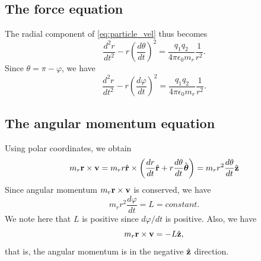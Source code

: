 \documentclass[oneside,a4paper,11pt]{report}
\begin{document}
\subsection{The force equation}
The radial component of \cref{eq:particle_vel} thus becomes 
\begin{equation}
    \frac{d^2 r}{dt^2} - r \left ( \frac{d\theta}{dt} \right )^2 = \frac{q_1 q_2}{4 \pi \epsilon_0 m_r} \frac{1}{r^2}.
\end{equation}
Since $\theta = \pi - \varphi$, we have
\begin{equation}
    \label{eq:particle_position_ode}
    \frac{d^2 r}{dt^2} - r \left ( \frac{d\varphi}{dt} \right )^2 = \frac{q_1 q_2}{4 \pi \epsilon_0 m_r} \frac{1}{r^2}.
\end{equation}

\subsection{The angular momentum equation}
Using polar coordinates, we obtain
\begin{equation}
    m_r \mathbf{r} \times \mathbf{v} = m_r r \hat{\mathbf{r}} \times \left ( \frac{dr}{dt} \hat{\mathbf{r}} + r \frac{d\theta}{dt} \hat{\boldsymbol{\theta}} \right ) = m_r r^2 \frac{d\theta}{dt} \hat{\mathbf{z}}
\end{equation}
Since angular momentum $m_r \mathbf{r} \times \mathbf{v}$ is conserved, we have
\begin{equation}
    \label{eq:particle_cons_angular_polar}
    m_r r^2 \frac{d\varphi}{dt} = L = constant.
\end{equation}
We note here that $L$ is positive since $d\varphi/dt$ is positive. Also, we have 
\begin{equation}
    \label{eq:particle_angular_sign}
    m_r \mathbf{r} \times \mathbf{v} = -L \hat{\mathbf{z}},
\end{equation}
that is, the angular momentum is in the negative $\hat{\mathbf{z}}$ direction.

\end{document}
